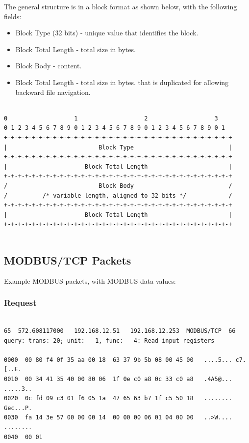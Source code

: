 \documentclass[11pt,]{article}
\begin{document}
The general structure is in a block format as shown below, with the
following fields:

\begin{itemize}
\itemsep1pt\parskip0pt
\item
  Block Type (32 bits) - unique value that identifies the block.
\item
  Block Total Length - total size in bytes.
\item
  Block Body - content.
\item
  Block Total Length - total size in bytes. that is duplicated for
  allowing backward file navigation.
\end{itemize}

\newpage

\begin{verbatim}

0                   1                   2                   3
0 1 2 3 4 5 6 7 8 9 0 1 2 3 4 5 6 7 8 9 0 1 2 3 4 5 6 7 8 9 0 1
+-+-+-+-+-+-+-+-+-+-+-+-+-+-+-+-+-+-+-+-+-+-+-+-+-+-+-+-+-+-+-+-+
|                          Block Type                           |
+-+-+-+-+-+-+-+-+-+-+-+-+-+-+-+-+-+-+-+-+-+-+-+-+-+-+-+-+-+-+-+-+
|                      Block Total Length                       |
+-+-+-+-+-+-+-+-+-+-+-+-+-+-+-+-+-+-+-+-+-+-+-+-+-+-+-+-+-+-+-+-+
/                          Block Body                           /
/          /* variable length, aligned to 32 bits */            /
+-+-+-+-+-+-+-+-+-+-+-+-+-+-+-+-+-+-+-+-+-+-+-+-+-+-+-+-+-+-+-+-+
|                      Block Total Length                       |
+-+-+-+-+-+-+-+-+-+-+-+-+-+-+-+-+-+-+-+-+-+-+-+-+-+-+-+-+-+-+-+-+    
    
\end{verbatim}

\subsection{MODBUS/TCP Packets}\label{modbustcp-packets}

Example MODBUS packets, with MODBUS data values:

\subsubsection{Request}\label{request}

\begin{verbatim}

65  572.608117000   192.168.12.51   192.168.12.253  MODBUS/TCP  66
query: trans: 20; unit:   1, func:   4: Read input registers

0000  00 80 f4 0f 35 aa 00 18  63 37 9b 5b 08 00 45 00   ....5... c7.[..E.
0010  00 34 41 35 40 00 80 06  1f 0e c0 a8 0c 33 c0 a8   .4A5@... .....3..
0020  0c fd 09 c3 01 f6 05 1a  47 65 63 b7 1f c5 50 18   ........ Gec...P.
0030  fa 14 3e 57 00 00 00 14  00 00 00 06 01 04 00 00   ..>W.... ........
0040  00 01    
    
\end{verbatim}
\end{document}
